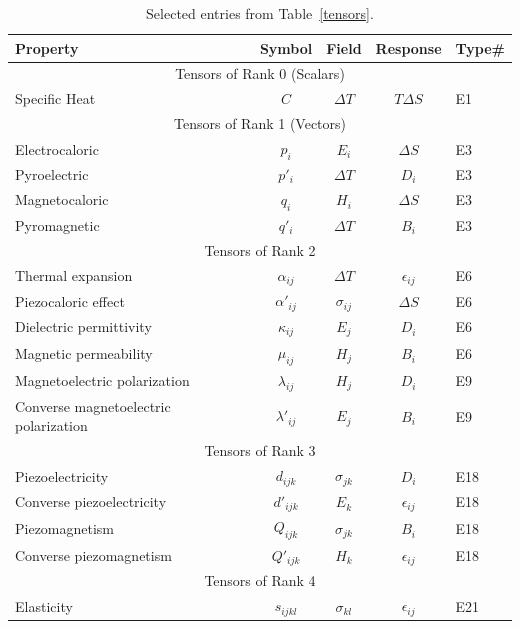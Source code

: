 \begin{table}[h]
\centering\leavevmode
\begin{tabular}{|l|c|c|c|l|}
\hline
Property   &  Symbol   &  Field & Response & Type\#  \\
\hline
\hline
\multicolumn{5}{|c|}{Tensors of Rank 0 (Scalars)}\\
\hline
Specific Heat   &   $C$   & $\Delta T$ & $T\Delta S$ &   E1\\
\hline
\multicolumn{5}{|c|}{Tensors of Rank 1 (Vectors)}\\
\hline
Electrocaloric  &  $p_i$  & $E_i$ & $\Delta S$ & E3\\
Pyroelectric  &  $p'_i$  & $\Delta T$ & $D_i$ & E3\\
Magnetocaloric & $q_i$  &  $H_i$ & $\Delta S$ & E3\\
Pyromagnetic & $q'_i$  &  $\Delta T$ & $B_i$ & E3\\
\hline
\multicolumn{5}{|c|}{Tensors of Rank 2}\\
\hline
Thermal expansion  & $\alpha_{ij}$  & $\Delta T$ & $\epsilon_{ij}$ & E6\\
Piezocaloric effect  & $\alpha'_{ij}$  & $\sigma_{ij}$ & $\Delta S$ & E6\\
Dielectric permittivity & $\kappa_{ij}$  & $E_j$ & $D_i$ &  E6\\
Magnetic permeability & $\mu_{ij}$ & $H_j$ & $B_i$ & E6\\
Magnetoelectric polarization & $\lambda_{ij}$ & $H_j$ & $D_i$  & E9\\
Converse magnetoelectric polarization & $\lambda'_{ij}$ & $E_j$ & $B_i$  & E9\\
\hline
\multicolumn{5}{|c|}{Tensors of Rank 3}\\
\hline
Piezoelectricity  &  $d_{ijk}$  & $\sigma_{jk}$ & $D_i$ &  E18\\
Converse piezoelectricity  &  $d'_{ijk}$  & $E_k$ & $\epsilon_{ij}$ &  E18\\
Piezomagnetism &  $Q_{ijk}$  & $\sigma_{jk}$ & $B_i$ & E18\\
Converse piezomagnetism &  $Q'_{ijk}$  & $H_{k}$ & $\epsilon_{ij}$ & E18\\
\hline
\multicolumn{5}{|c|}{Tensors of Rank 4}\\
\hline
Elasticity  &  $s_{ijkl}$  & $\sigma_{kl}$ & $\epsilon_{ij}$  & E21\\
\hline
\end{tabular}
\caption{Selected entries from Table~\ref{tensors}.}
\label{\chabbr:tb:small}
\end{table}

